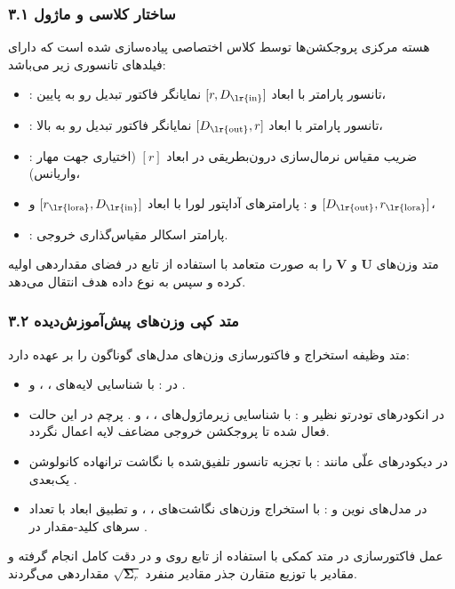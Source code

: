 \subsubsection*{۳.۱ ساختار کلاسی و ماژول }
هسته مرکزی پروجکشن‌ها توسط کلاس اختصاصی  پیاده‌سازی شده است که دارای فیلدهای تانسوری زیر می‌باشد:
\begin{itemize}
    \item {}: تانسور پارامتر با ابعاد $[r, D_{\text{\lr{in}}}]$ نمایانگر فاکتور تبدیل رو به پایین،
    \item {}: تانسور پارامتر با ابعاد $[D_{\text{\lr{out}}}, r]$ نمایانگر فاکتور تبدیل رو به بالا،
    \item {}: ضریب مقیاس نرمال‌سازی درون‌بطریقی  در ابعاد $[r]$ (اختیاری جهت مهار واریانس)،
    \item {} و : پارامترهای آداپتور لورا با ابعاد $[r_{\text{\lr{lora}}}, D_{\text{\lr{in}}}]$ و $[D_{\text{\lr{out}}}, r_{\text{\lr{lora}}}]$،
    \item {}: پارامتر اسکالر مقیاس‌گذاری خروجی.
\end{itemize}

متد  وزن‌های $\mathbf{U}$ و $\mathbf{V}$ را به صورت متعامد  با استفاده از تابع  در فضای  مقداردهی اولیه کرده و سپس به نوع داده هدف انتقال می‌دهد.

\subsubsection*{۳.۲ متد کپی وزن‌های پیش‌آموزش‌دیده }
متد  وظیفه استخراج و فاکتورسازی وزن‌های مدل‌های گوناگون را بر عهده دارد:
\begin{itemize}
    \item در : با شناسایی لایه‌های ، ،  و .
    \item در انکودرهای تودرتو نظیر  و : با شناسایی زیرماژول‌های ، ،  و . پرچم  در این حالت فعال شده تا پروجکشن خروجی مضاعف لایه اعمال نگردد.
    \item در دیکودرهای علّی مانند : با تجزیه تانسور تلفیق‌شده  با نگاشت ترانهاده کانولوشن یک‌بعدی .
    \item در مدل‌های نوین  و : با استخراج وزن‌های نگاشت‌های ، ،  و تطبیق ابعاد با تعداد سرهای کلید-مقدار در .
\end{itemize}
عمل فاکتورسازی در متد کمکی  با استفاده از تابع  روی  و در دقت کامل انجام گرفته و مقادیر با توزیع متقارن جذر مقادیر منفرد $\sqrt{\mathbf{\Sigma}_r}$ مقداردهی می‌گردند.


